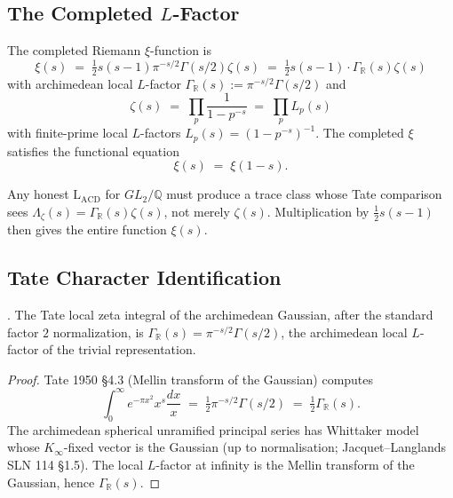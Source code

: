 \subsection{The Completed \(L\)-Factor}

The completed Riemann \(\xi\)-function is
\begin{equation}
\label{v4-arith:lacd:eq:xi-def}
\xi(s) \;=\; \tfrac{1}{2}s(s-1)\pi^{-s/2}\Gamma(s/2)\zeta(s) \;=\; \tfrac{1}{2}s(s-1)\cdot\Gamma_{\mathbb{R}}(s)\zeta(s)
\end{equation}
with archimedean local \(L\)-factor
\(\Gamma_{\mathbb{R}}(s) := \pi^{-s/2}\Gamma(s/2)\) and
\begin{equation}
\zeta(s) \;=\; \prod_{p}\frac{1}{1 - p^{-s}} \;=\; \prod_{p}L_{p}(s)
\end{equation}
with finite-prime local \(L\)-factors
\(L_{p}(s) = (1 - p^{-s})^{-1}\). The completed \(\xi\) satisfies the
functional equation
\begin{equation}
\label{v4-arith:lacd:eq:fe}
\xi(s) \;=\; \xi(1 - s).
\end{equation}

Any honest \(\mathrm{L}_{\mathrm{ACD}}\) for \(GL_{2}/\mathbb{Q}\) must
produce a trace class whose Tate comparison sees
\(\Lambda_{\zeta}(s)=\Gamma_{\mathbb R}(s)\zeta(s)\), not merely
\(\zeta(s)\). Multiplication by \(\tfrac12 s(s-1)\) then gives the
entire function \(\xi(s)\).

\subsection{Tate Character Identification}

\begin{proposition}[archimedean character \(=\Gamma_{\mathbb{R}}\)]
\label{v4-arith:lacd:prop:arch-character}
\ClaimStatusProvedHere. The Tate local zeta integral of the
archimedean Gaussian, after the standard factor \(2\) normalization, is
\(\Gamma_{\mathbb{R}}(s) = \pi^{-s/2}\Gamma(s/2)\), the archimedean
local \(L\)-factor of the trivial representation.
\end{proposition}

\begin{proof}
Tate 1950 \S4.3 (Mellin transform of the Gaussian) computes
\begin{equation}
\int_{0}^{\infty}e^{-\pi x^{2}}x^{s}\frac{dx}{x} \;=\; \tfrac{1}{2}\pi^{-s/2}\Gamma(s/2) \;=\; \tfrac{1}{2}\Gamma_{\mathbb{R}}(s).
\end{equation}
The archimedean spherical unramified principal series has Whittaker
model whose \(K_{\infty}\)-fixed vector is the Gaussian (up to
normalisation; Jacquet--Langlands SLN 114 \S1.5). The local
\(L\)-factor at infinity is the Mellin transform of the Gaussian,
hence \(\Gamma_{\mathbb{R}}(s)\).
\end{proof}

